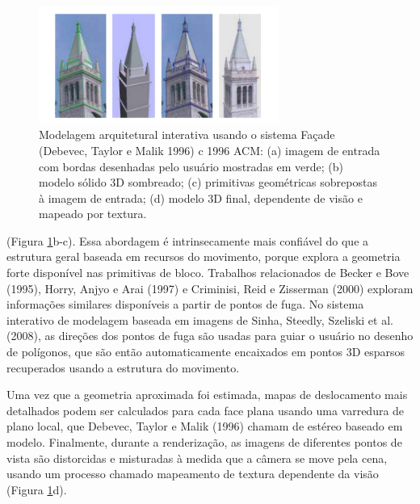 \documentclass{article}
\begin{document}
\begin{figure}[!htb]
    \centering
    \includegraphics[width=0.7\textwidth]{img1.png}
    \caption{Modelagem arquitetural interativa usando o sistema Façade (Debevec, Taylor e Malik 1996) c 1996 ACM: (a) imagem de entrada com bordas desenhadas pelo usuário mostradas em verde; (b) modelo sólido 3D sombreado; (c) primitivas geométricas sobrepostas à imagem de entrada; (d) modelo 3D final, dependente de visão e mapeado por textura.}
    \label{fig:img1}
\end{figure}

(Figura \ref{fig:img1}b-c). Essa abordagem é intrinsecamente mais confiável do que a estrutura geral baseada em recursos do movimento, porque explora a geometria forte disponível nas primitivas de bloco. Trabalhos relacionados de Becker e Bove (1995)\cite{Becker}, Horry, Anjyo e Arai (1997)\cite{Horry:1997:TPU:258734.258854} e Criminisi, Reid e Zisserman (2000)\cite{Criminisi00a} exploram informações similares disponíveis a partir de pontos de fuga. No sistema interativo de modelagem baseada em imagens de Sinha, Steedly, Szeliski et al. (2008)\cite{Sinha:2008:IAM:1409060.1409112}, as direções dos pontos de fuga são usadas para guiar o usuário no desenho de polígonos, que são então automaticamente encaixados em pontos 3D esparsos recuperados usando a estrutura do movimento.

Uma vez que a geometria aproximada foi estimada, mapas de deslocamento mais detalhados podem ser calculados para cada face plana usando uma varredura de plano local, que Debevec, Taylor e Malik (1996)\cite{Debevec:1996:MRA:237170.237191} chamam de estéreo baseado em modelo. Finalmente, durante a renderização, as imagens de diferentes pontos de vista são distorcidas e misturadas à medida que a câmera se move pela cena, usando um processo chamado mapeamento de textura dependente da visão (Figura \ref{fig:img1}d).
\end{document}
